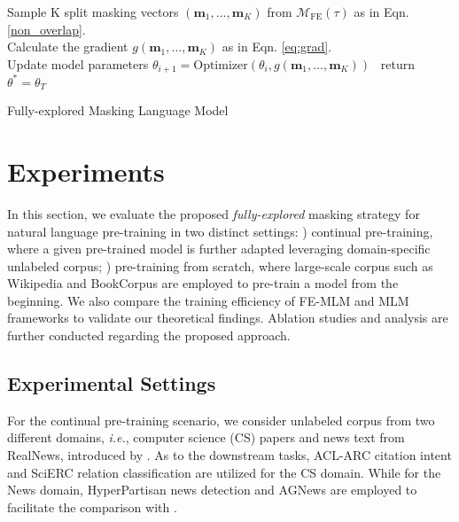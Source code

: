 \documentclass{article} \usepackage{iclr2021_conference,times}
\def\vm{{\bm{m}}}
\theoremstyle{plain}
\begin{document}
\begin{algorithm}[H]
\SetAlgoLined
{}
 { \hspace{0.0cm}Sample K split masking vectors $(\vm_1, ..., \vm_K)$ from $\mathcal{M}_{{\text{FE}}}(\tau)$ as in Eqn.\ref{non_overlap}. \\Calculate the gradient $g(\vm_1, ..., \vm_K)$ as in Eqn. \ref{eq:grad}. \\Update model parameters $\theta_{i+1} = \text{Optimizer}(\theta_i, g(\vm_1, ..., \vm_K))$ }\
{return $\theta^* = \theta_T$}
\label{alg:msk}
\caption{Fully-explored Masking Language Model}
\end{algorithm}


















\vspace{-2mm}
\section{Experiments}
\vspace{-3mm}
In this section, we evaluate the proposed \emph{fully-explored} masking strategy for natural language pre-training in two distinct settings: 
\emph{\romannumeral1}) continual pre-training, where a given pre-trained model is further adapted leveraging domain-specific unlabeled corpus;
\emph{\romannumeral2}) pre-training from scratch, where large-scale corpus such as Wikipedia and BookCorpus are employed to pre-train a model from the beginning.
We also compare the training efficiency of FE-MLM and MLM frameworks to validate our theoretical findings.
Ablation studies and analysis are further conducted regarding the proposed approach.

\vspace{-4mm}
\subsection{Experimental Settings}
\vspace{-3mm}
For the continual pre-training scenario, we consider unlabeled corpus from two different domains, \emph{i.e.}, computer science (CS) papers and news text from RealNews, introduced by \cite{gururangan2020don}. As to the downstream tasks, ACL-ARC citation intent \cite{Jurgens2018MeasuringTE} and SciERC relation classification \cite{Luan2018MultiTaskIO} are utilized for the CS domain. While for the News domain, HyperPartisan news detection \cite{kiesel2019semeval} and AGNews \cite{zhang2015character} are employed to facilitate the comparison with \cite{gururangan2020don}. 
\end{document}
